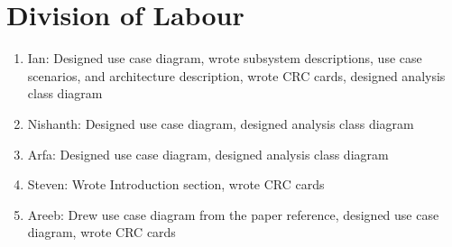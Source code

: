 \documentclass[]{article}
\begin{document}
\section{Division of Labour}
\label{sec:division_of_labour}
\begin{enumerate}
	\item Ian: Designed use case diagram, wrote subsystem descriptions, use case scenarios, and architecture description, wrote CRC cards, designed analysis class diagram
	\item Nishanth: Designed use case diagram, designed analysis class diagram
	\item Arfa: Designed use case diagram, designed analysis class diagram
	\item Steven: Wrote Introduction section, wrote CRC cards
	\item Areeb: Drew use case diagram from the paper reference, designed use case diagram, wrote CRC cards
\end{enumerate}

\end{document}
